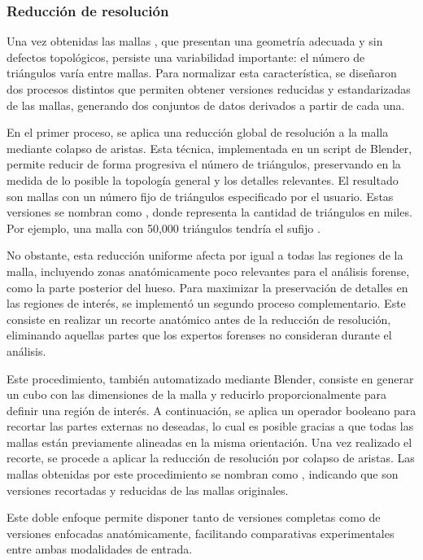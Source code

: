 \subsubsection{Reducción de resolución}
\label{section4:data_reduction}
Una vez obtenidas las mallas , que presentan una geometría adecuada y sin defectos topológicos, persiste una variabilidad importante: el número de triángulos varía entre mallas. Para normalizar esta característica, se diseñaron dos procesos distintos que permiten obtener versiones reducidas y estandarizadas de las mallas, generando dos conjuntos de datos derivados a partir de cada una.

En el primer proceso, se aplica una reducción global de resolución a la malla  mediante colapso de aristas. Esta técnica, implementada en un script de Blender, permite reducir de forma progresiva el número de triángulos, preservando en la medida de lo posible la topología general y los detalles relevantes. El resultado son mallas con un número fijo de triángulos especificado por el usuario. Estas versiones se nombran como , donde  representa la cantidad de triángulos en miles. Por ejemplo, una malla con 50,000 triángulos tendría el sufijo .

No obstante, esta reducción uniforme afecta por igual a todas las regiones de la malla, incluyendo zonas anatómicamente poco relevantes para el análisis forense, como la parte posterior del hueso. Para maximizar la preservación de detalles en las regiones de interés, se implementó un segundo proceso complementario. Este consiste en realizar un recorte anatómico antes de la reducción de resolución, eliminando aquellas partes que los expertos forenses no consideran durante el análisis.

Este procedimiento, también automatizado mediante Blender, consiste en generar un cubo con las dimensiones de la malla y reducirlo proporcionalmente para definir una región de interés. A continuación, se aplica un operador booleano para recortar las partes externas no deseadas, lo cual es posible gracias a que todas las mallas están previamente alineadas en la misma orientación. Una vez realizado el recorte, se procede a aplicar la reducción de resolución por colapso de aristas. Las mallas obtenidas por este procedimiento se nombran como , indicando que son versiones recortadas y reducidas de las mallas originales.

Este doble enfoque permite disponer tanto de versiones completas como de versiones enfocadas anatómicamente, facilitando comparativas experimentales entre ambas modalidades de entrada.

